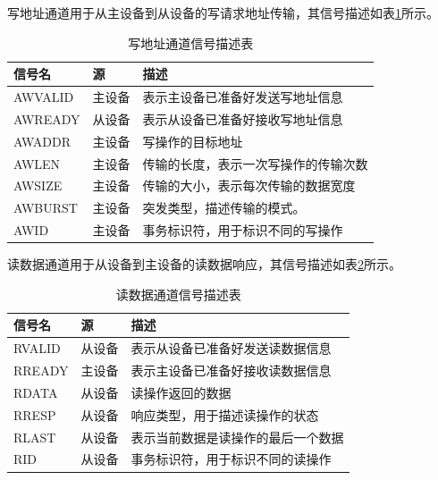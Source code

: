 写地址通道用于从主设备到从设备的写请求地址传输，其信号描述如表\ref{tab:write_address_bus}所示。

\begin{table}[H]
	\centering
	\caption{写地址通道信号描述表}
	\begin{tabularx}{\textwidth}{>{\centering\arraybackslash}p{4cm} >{\centering\arraybackslash}p{3cm} >{\centering\arraybackslash}X}
		\toprule
		\textbf{信号名} & \textbf{源} & \textbf{描述}        \\
		\midrule
		AWVALID      & 主设备        & 表示主设备已准备好发送写地址信息   \\
		AWREADY      & 从设备        & 表示从设备已准备好接收写地址信息   \\
		AWADDR       & 主设备        & 写操作的目标地址           \\
		AWLEN        & 主设备        & 传输的长度，表示一次写操作的传输次数 \\
		AWSIZE       & 主设备        & 传输的大小，表示每次传输的数据宽度  \\
		AWBURST      & 主设备        & 突发类型，描述传输的模式。      \\
		AWID         & 主设备        & 事务标识符，用于标识不同的写操作   \\
		\bottomrule
	\end{tabularx}
	\label{tab:write_address_bus}
\end{table}

读数据通道用于从设备到主设备的读数据响应，其信号描述如表\ref{tab:read_data_bus}所示。

\begin{table}[H]
	\centering
	\caption{读数据通道信号描述表}
	\begin{tabularx}{\textwidth}{>{\centering\arraybackslash}p{4cm} >{\centering\arraybackslash}p{3cm} >{\centering\arraybackslash}X}
		\toprule
		\textbf{信号名} & \textbf{源} & \textbf{描述}       \\
		\midrule
		RVALID       & 从设备        & 表示从设备已准备好发送读数据信息  \\
		RREADY       & 主设备        & 表示主设备已准备好接收读数据信息  \\
		RDATA        & 从设备        & 读操作返回的数据          \\
		RRESP        & 从设备        & 响应类型，用于描述读操作的状态   \\
		RLAST        & 从设备        & 表示当前数据是读操作的最后一个数据 \\
		RID          & 从设备        & 事务标识符，用于标识不同的读操作  \\
		\bottomrule
	\end{tabularx}
	\label{tab:read_data_bus}
\end{table}

